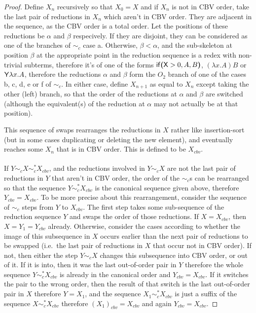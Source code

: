 
\begin{proof}

Define $X_n$ recursively so that $X_0 = X$ and if $X_n$ is not in CBV order, take the last pair of reductions in $X_n$ which aren't in CBV order. They are adjacent in the sequence, as the CBV order is a total order. Let the positions of these reductions be $\alpha$ and $\beta$ respecively. If they are disjoint, they can be considered as one of the branches of $\sim_c$ case a. Otherwise, $\beta < \alpha$, and the sub-skeleton at position $\beta$ at the appropriate point in the reduction sequence is a redex with non-trivial subterms, therefore it's of one of the forms $\mathsf{if}\boldsymbol{(}\mathsf{X}>0, A, B\boldsymbol{)}$, $(\lambda x.A) B$ or $\mathsf{Y} \lambda x. A$, therefore the reductions $\alpha$ and $\beta$ form the $O_2$ branch of one of the cases b, c, d, e or f of $\sim_c$. In either case, define $X_{n+1}$ as equal to $X_n$ except taking the other (left) branch, so that the order of the reductions at $\alpha$ and $\beta$ are switched (although the equivalent(s) of the reduction at $\alpha$ may not actually be at that position).

This sequence of swaps rearranges the reductions in $X$ rather like insertion-sort (but in some cases duplicating or deleting the new element), and eventually reaches some $X_n$ that is in CBV order. This is defined to be $X_{cbv}$.

\paragraph{}
If $Y \sim_c X \sim_c^* X_{cbv}$, and the reductions involved in $Y \sim_c X$ are not the last pair of reductions in $Y$ that aren't in CBV order, the order of the $\sim_c$s can be rearranged so that the sequence $Y \sim_c^* X_{cbv}$ is the canonical sequence given above, therefore $Y_{cbv} = X_{cbv}$. To be more precise about this rearrangement, consider the sequence of $\sim_c$ steps from $Y$ to $X_{cbv}$. The first step takes some sub-sequence of the reduction sequence $Y$ and swaps the order of those reductions. If $X = X_{cbv}$, then $X = Y_1 = Y_{cbv}$ already. Otherwise, consider the cases according to whether the image of this subsequence in $X$ occurs earlier than the next pair of reductions to be swapped (i.e.~the last pair of reductions in $X$ that occur not in CBV order). If not, then either the step $Y \sim_c X$ changes this subsequence into CBV order, or out of it. If it is into, then it was the last out-of-order pair in $Y$ therefore the whole sequence $Y \sim_c^* X_{cbv}$ is already in the canonical order and $Y_{cbv} = X_{cbv}$. If it switches the pair to the wrong order, then the result of that switch is the last out-of-order pair in $X$ therefore $Y = X_1$, and the sequence $X_1 \sim_c^* X_{cbv}$ is just a suffix of the sequence $X \sim_c^* X_{cbv}$ therefore $(X_1)_{cbv} = X_{cbv}$ and again $Y_{cbv} = X_{cbv}$.


\end{proof}
